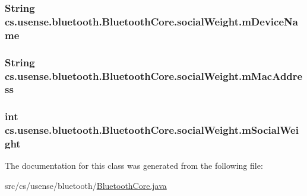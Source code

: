 \subsubsection[{m\+Device\+Name}]{\setlength{\rightskip}{0pt plus 5cm}String cs.\+usense.\+bluetooth.\+Bluetooth\+Core.\+social\+Weight.\+m\+Device\+Name}\label{classcs_1_1usense_1_1bluetooth_1_1_bluetooth_core_1_1social_weight_a19b055752980277d829ef14707f1eff3}
\hypertarget{classcs_1_1usense_1_1bluetooth_1_1_bluetooth_core_1_1social_weight_af0a9c30b68a2ab475de31d2167c47b6d}{}
\subsubsection[{m\+Mac\+Address}]{\setlength{\rightskip}{0pt plus 5cm}String cs.\+usense.\+bluetooth.\+Bluetooth\+Core.\+social\+Weight.\+m\+Mac\+Address}\label{classcs_1_1usense_1_1bluetooth_1_1_bluetooth_core_1_1social_weight_af0a9c30b68a2ab475de31d2167c47b6d}
\hypertarget{classcs_1_1usense_1_1bluetooth_1_1_bluetooth_core_1_1social_weight_aacf0d761e0b96154c51c4367c893ef5c}{}
\subsubsection[{m\+Social\+Weight}]{\setlength{\rightskip}{0pt plus 5cm}int cs.\+usense.\+bluetooth.\+Bluetooth\+Core.\+social\+Weight.\+m\+Social\+Weight}\label{classcs_1_1usense_1_1bluetooth_1_1_bluetooth_core_1_1social_weight_aacf0d761e0b96154c51c4367c893ef5c}


The documentation for this class was generated from the following file\+:\begin{DoxyCompactItemize}
\item 
src/cs/usense/bluetooth/\hyperlink{_bluetooth_core_8java}{Bluetooth\+Core.\+java}\end{DoxyCompactItemize}
